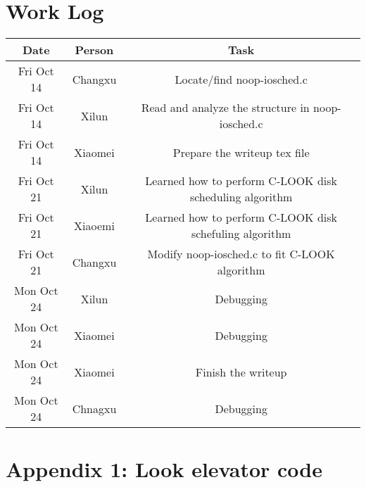 \documentclass[letterpaper,10pt]{article}
\begin{document}
\section*{Work Log}
\begin{tabular}{@{}ccc@{}}
    \toprule
    Date                & Person   & Task                                                      \\ \midrule
    Fri Oct 14          & Changxu  & Locate/find noop-iosched.c                                \\
    Fri Oct 14          & Xilun    & Read and analyze the structure in noop-iosched.c          \\
    Fri Oct 14          & Xiaomei  & Prepare the writeup tex file                              \\
    Fri Oct 21          & Xilun    & Learned how to perform C-LOOK disk scheduling algorithm   \\
    Fri Oct 21          & Xiaoemi  & Learned how to perform C-LOOK disk schefuling algorithm   \\
    Fri Oct 21          & Changxu  & Modify noop-iosched.c to fit C-LOOK algorithm             \\
    Mon Oct 24          & Xilun    & Debugging                                                 \\
    Mon Oct 24          & Xiaomei  & Debugging                                                 \\
    Mon Oct 24          & Xiaomei  & Finish the writeup                                        \\
    Mon Oct 24          & Chnagxu  & Debugging                                                 \\ \bottomrule
\end{tabular}

\newpage
\section*{Appendix 1: Look elevator code}

\end{document}
